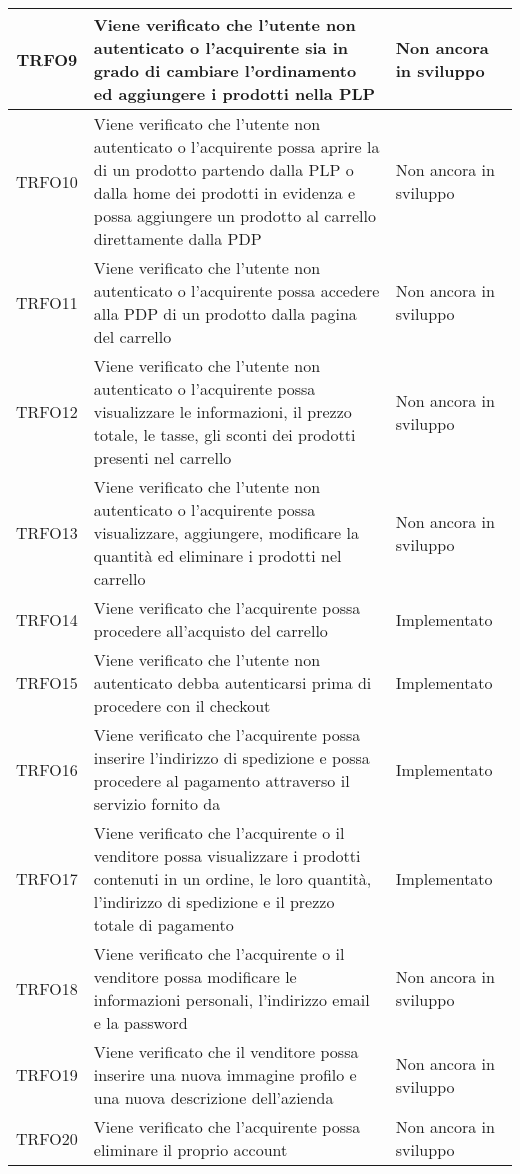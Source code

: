 \begin{longtable}{|c| C{10cm} |C{3cm}|}
	TRFO9 & Viene verificato che l'utente non autenticato o l'acquirente sia in grado di cambiare l'ordinamento ed aggiungere i prodotti nella PLP & Non ancora in sviluppo\\ \hline
	TRFO10 & Viene verificato che l'utente non autenticato o l'acquirente possa aprire la  di un prodotto partendo dalla PLP o dalla home dei prodotti in evidenza e possa aggiungere un prodotto al carrello direttamente dalla PDP & Non ancora in sviluppo\\ \hline
	TRFO11 & Viene verificato che l'utente non autenticato o l'acquirente possa accedere alla PDP di un prodotto dalla pagina del carrello & Non ancora in sviluppo\\ \hline
    TRFO12 & Viene verificato che l'utente non autenticato o l'acquirente possa visualizzare le informazioni, il prezzo totale, le tasse, gli sconti dei prodotti presenti nel carrello & Non ancora in sviluppo\\ \hline
    TRFO13 & Viene verificato che l'utente non autenticato o l'acquirente possa visualizzare, aggiungere, modificare la quantità ed eliminare i prodotti nel carrello & Non ancora in sviluppo\\ \hline
    TRFO14 & Viene verificato che l'acquirente possa procedere all'acquisto del carrello & Implementato\\ \hline
    TRFO15 & Viene verificato che l'utente non autenticato debba autenticarsi prima di procedere con il checkout & Implementato\\ \hline
    TRFO16 & Viene verificato che l'acquirente possa inserire l'indirizzo di spedizione e possa procedere al pagamento attraverso il servizio fornito da  & Implementato\\ \hline
	TRFO17 & Viene verificato che l'acquirente o il venditore possa visualizzare i prodotti contenuti in un ordine, le loro quantità, l'indirizzo di spedizione e il prezzo totale di pagamento & Implementato\\ \hline
	TRFO18 & Viene verificato che l'acquirente o il venditore possa modificare le informazioni personali, l'indirizzo email e la password & Non ancora in sviluppo\\ \hline
	TRFO19 & Viene verificato che il venditore possa inserire una nuova immagine profilo e una nuova descrizione dell'azienda & Non ancora in sviluppo\\ \hline
	TRFO20 & Viene verificato che l'acquirente possa eliminare il proprio account & Non ancora in sviluppo\\ \hline

\end{longtable}
